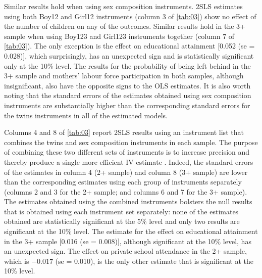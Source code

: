 Similar results hold when using sex composition instruments. 2SLS estimates using both Boy12 and Girl12 instruments (column 3 of \autoref{tab:03}) show no effect of the number of children on any of the outcomes. Similar results hold in the 3+ sample when using Boy123 and Girl123 instruments together (column 7 of \autoref{tab:03}). The only exception is the effect on educational attainment [0.052 (se = 0.028)], which surprisingly, has an unexpected sign and is statistically significant only at the 10\% level. The results for the probability of being left behind in the 3+ sample and mothers' labour force participation in both samples, although insignificant, also have the opposite signs to the OLS estimates. It is also worth noting that the standard errors of the estimates obtained using sex composition instruments are substantially higher than the corresponding standard errors for the twins instruments in all of the estimated models.

Columns 4 and 8 of \autoref{tab:03} report 2SLS results using an instrument list that combines the twins and sex composition instruments in each sample. The purpose of combining these two different sets of instruments is to increase precision and thereby produce a single more efficient IV estimate \parencite{angrist_multiple_2010}. Indeed, the standard errors of the estimates in column 4 (2+ sample) and column 8 (3+ sample) are lower than the corresponding estimates using each group of instruments separately (columns 2 and 3 for the 2+ sample; and columns 6 and 7 for the 3+ sample). The estimates obtained using the combined instruments bolsters the null results that is obtained using each instrument set separately: none of the estimates obtained are statistically significant at the 5\% level and only two results are significant at the 10\% level. The estimate for the effect on educational attainment in the 3+ sample [0.016 (se = 0.008)], although significant at the 10\% level, has an unexpected sign. The effect on private school attendance in the 2+ sample, which is $ -0.017 $ (se = 0.010), is the only other estimate that is significant at the 10\% level.

